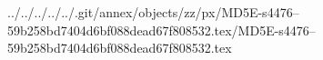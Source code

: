 ../../../../../.git/annex/objects/zz/px/MD5E-s4476--59b258bd7404d6bf088dead67f808532.tex/MD5E-s4476--59b258bd7404d6bf088dead67f808532.tex
